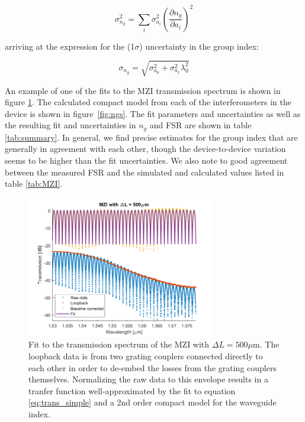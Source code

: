 \documentclass[journal]{IEEEtran}
\begin{document}
\begin{equation}
\sigma^2_{n_g} = \sum_i \sigma^2_{a_i} \left( \frac{\partial n_g}{\partial a_i} \right)^2
\end{equation}

arriving at the expression for the (1$\sigma$) uncertainty in the group index:

\begin{equation}
\sigma_{n_g} = \sqrt{\sigma^2_{a_0} + \sigma^2_{a_1} \lambda_0^2}
\end{equation}

An example of one of the fits to the MZI transmission spectrum is shown in figure \ref{fig:transFit}. The calculated compact model from each of the interferometers in the device is shown in figure~\ref{fig:ngs}. The fit parameters and uncertainties as well as the resulting fit and uncertainties in $n_g$ and FSR are shown in table \ref{tab:summary}. In general, we find precise estimates for the group index that are generally in agreement with each other, though the device-to-device variation seems to be higher than the fit uncertainties. We also note to good agreement between the measured FSR and the simulated and calculated values listed in table \ref{tab:MZI}.


\begin{figure}[t!]
  \centering
  \includegraphics[width = 3.25in]{fig/500um_MZI_fit.png}
  \caption{Fit to the transmission spectrum of the MZI with $\Delta L = 500\mu$m. The loopback data is from two grating couplers connected directly to each other in order to de-embed the losses from the grating couplers themselves. Normalizing the raw data to this envelope results in a tranfer function well-approximated by the fit to equation \ref{eq:trans_simple} and a 2nd order compact model for the waveguide index.}
  \label{fig:transFit}
\end{figure}

\end{document}
